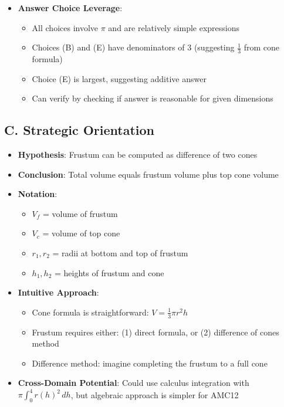 \documentclass[]{article}
\begin{document}
\begin{problemconfigbox}
\begin{itemize}[leftmargin=*]
\begin{itemize}
        \item Similar triangles relationship in frustum structure
    \end{itemize}
    \item \textbf{Answer Choice Leverage}: 
    \begin{itemize}
        \item All choices involve $\pi$ and are relatively simple expressions
        \item Choices (B) and (E) have denominators of 3 (suggesting $\frac{1}{3}$ from cone formula)
        \item Choice (E) is largest, suggesting additive answer
        \item Can verify by checking if answer is reasonable for given dimensions
    \end{itemize}
\end{itemize}

\subsection*{C. Strategic Orientation}
\begin{itemize}[leftmargin=*]
    \item \textbf{Hypothesis}: Frustum can be computed as difference of two cones
    \item \textbf{Conclusion}: Total volume equals frustum volume plus top cone volume
    \item \textbf{Notation}: 
    \begin{itemize}
        \item $V_f$ = volume of frustum
        \item $V_c$ = volume of top cone  
        \item $r_1, r_2$ = radii at bottom and top of frustum
        \item $h_1, h_2$ = heights of frustum and cone
    \end{itemize}
    \item \textbf{Intuitive Approach}: 
    \begin{itemize}
        \item Cone formula is straightforward: $V = \frac{1}{3}\pi r^2 h$
        \item Frustum requires either: (1) direct formula, or (2) difference of cones method
        \item Difference method: imagine completing the frustum to a full cone
    \end{itemize}
    \item \textbf{Cross-Domain Potential}: Could use calculus integration with $\pi \int_0^4 r(h)^2 \, dh$, but algebraic approach is simpler for AMC12
\end{itemize}
\end{problemconfigbox}
\end{document}

